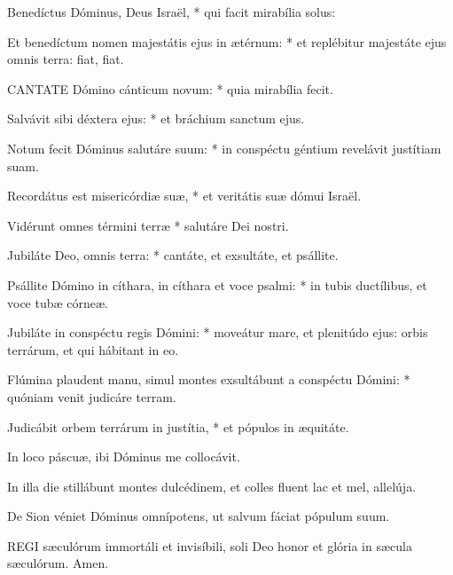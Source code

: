 Benedíctus Dóminus, Deus Israël, * qui facit mirabília solus:

Et benedíctum nomen majestátis ejus in ætérnum: * et replébitur majestáte ejus omnis terra: fiat, fiat.



\lettrine[lines=2]{C}{ANTATE} Dómino cánticum novum: * quia mirabília fecit.

Salvávit sibi déxtera ejus: * et bráchium sanctum ejus.

Notum fecit Dóminus salutáre suum: * in conspéctu géntium revelávit justítiam suam.

Recordátus est misericórdiæ suæ, * et veritátis suæ dómui Israël.

Vidérunt omnes términi terræ * salutáre Dei nostri.

Jubiláte Deo, omnis terra: * cantáte, et exsultáte, et psállite.

Psállite Dómino in cíthara, in cíthara et voce psalmi: * in tubis ductílibus, et voce tubæ córneæ.

Jubiláte in conspéctu regis Dómini: * moveátur mare, et plenitúdo ejus: orbis terrárum, et qui hábitant in eo.

Flúmina plaudent manu, simul montes exsultábunt a conspéctu Dómini: * quóniam venit judicáre terram.

Judicábit orbem terrárum in justítia, * et pópulos in æquitáte.


  In loco páscuæ, ibi Dóminus me collocávit.


  In illa die stillábunt montes dulcédinem, et colles fluent lac et mel, allelúja.

  De Sion véniet Dóminus omnípotens, ut salvum fáciat pópulum suum.



\lettrine[lines=2]{R}{EGI} sæculórum immortáli et invisíbili, soli Deo honor et glória in sæcula sæculórum. Amen.

